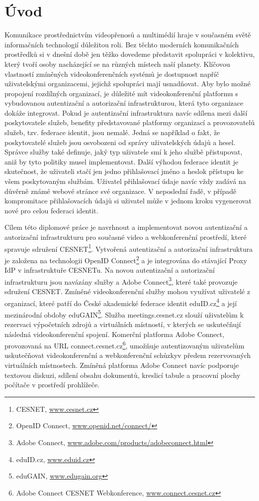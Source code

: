\documentclass[
  printed, %
  twoside, %
  table,   %
  nolof,     %
  nolot,     %
]{fithesis3}
\begin{document}
\chapter{Úvod}
Komunikace prostřednictvím videopřenosů a multimédií hraje v současném světě informačních technologií důležitou roli. Bez těchto moderních komunikačních prostředků si v dnešní době jen těžko dovedeme představit spolupráci v kolektivu, který tvoří osoby nacházející se na různých místech naší planety. Klíčovou vlastností zmíněných videokonferenčních systémů je dostupnost napříč uživatelskými organizacemi, jejichž spolupráci mají usnadňovat. Aby bylo možné propojení rozdílných organizací, je důležité mít videokonferenční platformu s vybudovanou autentizační a autorizační infrastrukturou, která tyto organizace dokáže integrovat. Pokud je autentizační infrastruktura navíc sdílena mezi další poskytovatele služeb, benefity představované platformy organizací a provozovatelů služeb, tzv. federace identit, jsou nemalé. Jedná se například o fakt, že poskytovatelé služeb jsou osvobozeni od správy uživatelských údajů a hesel. Správce služby také definuje, jaký typ uživatele smí k jeho službě přistupovat, aniž by tyto politiky musel implementovat. Další výhodou federace identit je skutečnost, že uživateli stačí jen jedno přihlašovací jméno a heslo\break k přístupu ke všem poskytovaným službám. Uživatel přihlašovací údaje navíc vždy zadává na důvěrně známé webové stránce své organizace. V neposlední řadě, v případě kompromitace  přihlašovacích údajů si uživatel může v jednom kroku vygenerovat nové pro celou federaci identit. 

Cílem této diplomové práce je navrhnout a implementovat novou autentizační a autorizační infrastrukturu pro současné video a webkonferenční prostředí, které spravuje sdružení CESNET\footnote{CESNET, \url{www.cesnet.cz}}. Vytvořená autentizační a autorizační infrastruktura je založena na technologii OpenID Connect\footnote{OpenID Connect, \url{www.openid.net/connect/}}  a je integrována do stávající Proxy IdP v infrastruktuře CESNETu. Na novou autentizační a autorizační infrastrukturu jsou navázány služby  a Adobe Connect\footnote{Adobe Connect, \url{www.adobe.com/products/adobeconnect.html}}, které také provozuje sdružení CESNET. Zmíněné videokonferenční služby mohou využívat uživatelé z organizací, které patří do České akademické federace identit eduID.cz\footnote{eduID.cz, \url{www.eduid.cz}} a její mezinárodní obdoby eduGAIN\footnote{eduGAIN, \url{www.edugain.org}}. Služba meetings.cesnet.cz slouží uživatelům k rezervaci výpočetních zdrojů a virtuálních místností, v kterých se uskutečňují následná videokonferenční spojení. Komerční platforma Adobe Connect, provozovaná na URL connect.cesnet.cz\footnote{Adobe Connect CESNET Webkonference, \url{www.connect.cesnet.cz}}, umožňuje autentizovaným uživatelům uskutečňovat videokonferenční a webkonferenční schůzky\break v předem rezervovaných virtuálních místnostech. Zmíněná platforma Adobe Connect navíc podporuje textovou diskuzi, sdílení obsahu dokumentů, kreslicí tabule a pracovní plochy počítače v prostředí prohlížeče. 
\end{document}
